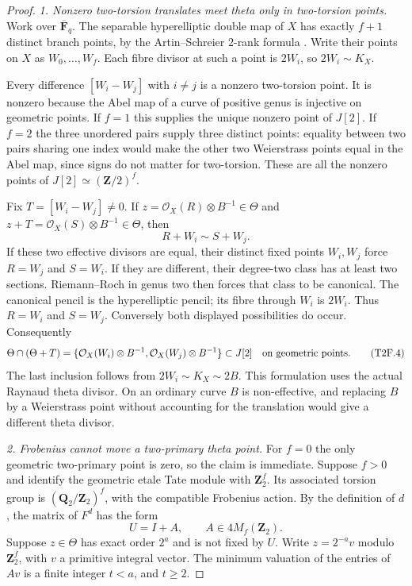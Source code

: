 \documentclass[11pt,a4paper]{article}
\begin{document}
\begin{proof}
\emph{1. Nonzero two-torsion translates meet theta only in
two-torsion points.}
Work over $\overline{\mathbf F}_q$. The separable hyperelliptic
double map of $X$ has exactly $f+1$ distinct branch points, by
the Artin--Schreier $2$-rank formula
\cite[Lemma~2.6]{PriesZhu2012}. Write their points on $X$ as
$W_0,\ldots,W_f$. Each fibre divisor at such a point is $2W_i$,
so $2W_i\sim K_X$.

Every difference $[W_i-W_j]$ with $i\ne j$ is a nonzero
two-torsion point. It is nonzero because the Abel map of a curve
of positive genus is injective on geometric points. If $f=1$
this supplies the unique nonzero point of $J[2]$. If $f=2$ the
three unordered pairs supply three distinct points: equality
between two pairs sharing one index would make the other two
Weierstrass points equal in the Abel map, since signs do not
matter for two-torsion. These are all the nonzero points of
$J[2]\simeq(\mathbf Z/2)^f$.

Fix $T=[W_i-W_j]\ne0$. If
$z=\mathcal O_X(R)\otimes B^{-1}\in\Theta$ and
$z+T=\mathcal O_X(S)\otimes B^{-1}\in\Theta$, then
\[
                        R+W_i\sim S+W_j.
 \tag{T2F.3}
\]
If these two effective divisors are equal, their distinct fixed
points $W_i,W_j$ force $R=W_j$ and $S=W_i$. If they are
different, their degree-two class has at least two sections.
Riemann--Roch in genus two then forces that class to be canonical.
The canonical pencil is the hyperelliptic pencil; its fibre
through $W_i$ is $2W_i$. Thus $R=W_i$ and $S=W_j$.
Conversely both displayed possibilities do occur. Consequently
\[
 \Theta\cap(\Theta+T)
   =\{\mathcal O_X(W_i)\otimes B^{-1},
       \mathcal O_X(W_j)\otimes B^{-1}\}
                  \subset J[2]
 \quad\hbox{on geometric points}.
 \tag{T2F.4}
\]
The last inclusion follows from $2W_i\sim K_X\sim2B$.
This formulation uses the actual Raynaud theta divisor. On an
ordinary curve $B$ is non-effective, and replacing $B$ by a
Weierstrass point without accounting for the translation would
give a different theta divisor.

\emph{2. Frobenius cannot move a two-primary theta point.}
For $f=0$ the only geometric two-primary point is zero, so the
claim is immediate. Suppose $f>0$ and identify the geometric
etale Tate module with $\mathbf Z_2^f$. Its associated torsion
group is $(\mathbf Q_2/\mathbf Z_2)^f$, with the compatible
Frobenius action. By the definition of $d$, the matrix of $F^d$
has the form
\[
                        U=I+A,\qquad A\in4M_f(\mathbf Z_2).
 \tag{T2F.5}
\]
Suppose $z\in\Theta$ has exact order $2^a$ and is not fixed by
$U$. Write $z=2^{-a}v$ modulo $\mathbf Z_2^f$, with $v$ a
primitive integral vector. The minimum valuation of the entries
of $Av$ is a finite integer $t<a$, and $t\ge2$.


\end{proof}
\end{document}
